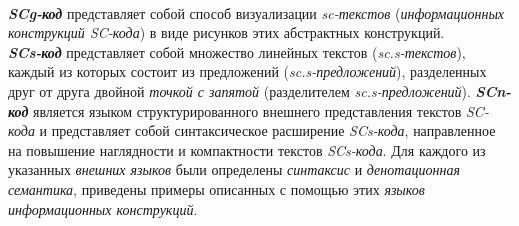\begin{SCn}
\begin{scnstruct}
{            \\\textbf{\textit{SCg-код}} представляет собой способ визуализации \textit{sc-текстов} (\textit{информационных конструкций SC-кода}) в виде рисунков этих абстрактных конструкций.
            \\\textbf{\textit{SCs-код}} представляет собой множество линейных текстов (\textit{sc.s-текстов}), каждый из которых состоит из предложений (\textit{sc.s-предложений}), разделенных друг от друга двойной \textit{точкой с запятой} (разделителем \textit{sc.s-предложений}).
            \textbf{\textit{SCn-код}} является языком структурированного внешнего представления текстов \textit{SC-кода} и представляет собой синтаксическое расширение \textit{SCs-кода}, направленное на повышение наглядности и компактности текстов \textit{SCs-кода}.
            Для каждого из указанных \textit{внешних языков} были определены \textit{синтаксис} и \textit{денотационная семантика}, приведены примеры описанных с помощью этих \textit{языков} \textit{информационных конструкций}.}
            

\end{scnstruct}
\end{SCn}
